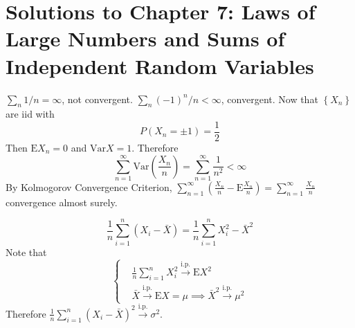\section{Solutions to Chapter 7: Laws of Large Numbers and Sums of Independent Random Variables}
\label{sec:solutions-chapter-7}

\setcounter{Lcount}{0}
\begin{list}{7.7.}{}
\item $\sum_n1/n = \infty$, not convergent. $\sum_n\left(-1\right)^n/n < \infty$, convergent. Now that $\left\{X_n\right\}$ are iid with
  \[
    P\left(X_n = \pm 1\right) = \frac{1}{2}
  \]
  Then $\mathrm{E}X_n = 0$ and $\mathrm{Var}X = 1$. Therefore
  \[
    \sum\limits_{n=1}^\infty\mathrm{Var}\left(\frac{X_n}{n}\right)
    = \sum\limits_{n=1}^\infty\frac{1}{n^2}<\infty
  \]
  By Kolmogorov Convergence Criterion, $\sum\limits_{n=1}^\infty\left(\frac{X_n}{n} - \mathrm{E}\frac{X_n}{n}\right) = \sum\limits_{n=1}^\infty\frac{X_n}{n}$ convergence almost surely.
  
\item \[
    \frac{1}{n}\sum\limits_{i=1}^n\left(X_i - \bar{X}\right) = \frac{1}{n}\sum\limits_{i=1}^nX_i^2 - \bar{X}^2
  \]
  Note that
  \[
    \left\{
      \begin{aligned}
        & \frac{1}{n}\sum\limits_{i=1}^nX_i^2 \overset{\mathrm{i.p.}}{\longrightarrow} \mathrm{E}X^2    \\
        & \bar{X} \overset{\mathrm{i.p.}}{\longrightarrow} \mathrm{E}X = \mu
        \implies \bar{X}^2 \overset{\mathrm{i.p.}}{\longrightarrow} \mu^2
      \end{aligned}
    \right.
  \]
  Therefore $\frac{1}{n}\sum\limits_{i=1}^n\left(X_i - \bar{X}\right)^2 \overset{\mathrm{i.p.}}{\longrightarrow} \sigma^2$.
\end{list}

\clearpage{}

